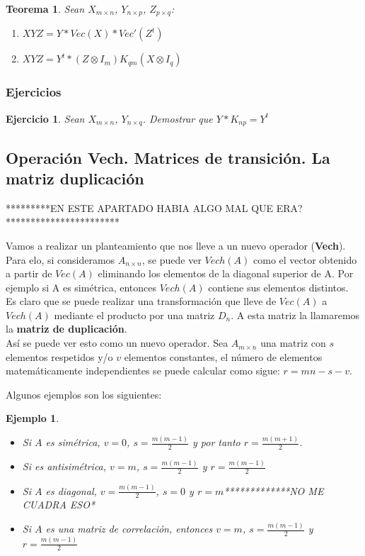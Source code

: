 \documentclass{article}
\theoremstyle{theorem-style}  %
\newtheorem{theorem}{Teorema}[section]  %
\theoremstyle{definition-style}
\theoremstyle{example-style}
\newtheorem{example}{Ejemplo}[section]
\theoremstyle{exercise-style}
\newtheorem{exercise}{Ejercicio}[section]
\begin{document}
	\begin{theorem}
		Sean $X_{m \times n}$, $Y_{n \times p}$, $Z_{p \times q}$:
		
		\begin{enumerate}
			\item $XYZ= Y*Vec(X)*Vec'(Z^t)$
			
			\item $ XYZ = Y^t * (Z \otimes I_m)K_{qm}(X \otimes I_q)$ 
		\end{enumerate}
	\end{theorem}
	
	\subsubsection{Ejercicios}
	\begin{exercise}
		Sean $X_{m \times n}$, $Y_{n \times q}$. Demostrar que $Y*K_{np}=Y^t$
	\end{exercise}

\subsection{Operación Vech. Matrices de transición. La matriz duplicación}

*********EN ESTE APARTADO HABIA ALGO MAL QUE ERA? ***********************

Vamos a realizar un planteamiento que nos lleve a un nuevo operador (\textbf{Vech}). Para elo, si consideramos $A_{n \times n}$, se puede ver $Vech(A)$ como el vector obtenido a partir de $Vec(A)$ eliminando los elementos de la diagonal superior de A. Por ejemplo si A es simétrica, entonces $Vech(A)$ contiene sus elementos distintos. \\

Es claro que se puede realizar una transformación que lleve de $Vec(A)$ a $Vech(A)$ mediante el producto por una matriz $D_n$. A esta matriz la llamaremos la \textbf{matriz de duplicación}. \\

Así se puede ver esto como un nuevo operador. Sea $A_{m \times n}$ una matriz con $s$ elementos respetidos y/o $v$ elementos constantes, el número de elementos matemáticamente independientes se puede calcular como sigue: $r=mn-s-v$.  

Algunos ejemplos son los siguientes:

\begin{example}	
	\begin{itemize}
		\item Si $A$ es simétrica, $v=0$, $s=\frac{m(m-1)}{2}$ y  por tanto $r=\frac{m(m+1)}{2}$.
		
		\item Si es antisimétrica, $v=m$, $s=\frac{m(m-1)}{2}$ y $r= \frac{m(m-1)}{2}$
		
		\item Si $A$ es diagonal, $v=\frac{m(m-1)}{2}$, $s=0$ y $r= m$*************NO ME CUADRA ESO* 
		
		\item Si $A$ es una matriz de correlación, entonces $v=m$, $s=\frac{m(m-1)}{2}$ y $r= \frac{m(m-1)}{2}$
	\end{itemize}
\end{example}
\end{document}
